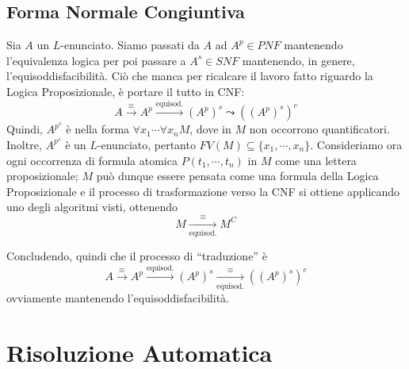 \subsection{Forma Normale Congiuntiva}
Sia $A$ un $L$-enunciato. Siamo passati da $A$ ad $A^p \in PNF$ mantenendo 
l'equivalenza logica per poi passare a $A^s \in SNF$ mantenendo, in genere, 
l'equisoddisfacibilità. Ciò che manca per ricalcare il lavoro fatto riguardo 
la Logica Proposizionale, è portare il tutto in CNF: 
$$
A \xrightarrow{\equiv} A^p \xrightarrow{\text{equisod.}}(A^p)^s \leadsto ((A^p)^s)^c
$$
Quindi, $A^{p^s}$ è nella forma $\forall x_1 \cdots \forall x_n M$, dove in $M$ 
non occorrono quantificatori. Inoltre, $A^{p^s}$ è un $L$-enunciato, pertanto 
$FV(M) \subseteq \{x_1, \cdots, x_n\}$.
Consideriamo ora ogni occorrenza di formula atomica $P(t_1, \cdots, t_n)$ in 
$M$ come una lettera proposizionale; $M$ può dunque essere pensata 
come una formula della Logica Proposizionale e il processo di trasformazione 
verso la CNF si ottiene applicando uno degli algoritmi visti, ottenendo 
$$
M \xrightarrow[\text{equisod.}]{\equiv} M^C
$$

Concludendo, quindi che il processo di ``traduzione'' è 
$$
A \xrightarrow{\equiv} A^p \xrightarrow{\text{equisod.}}(A^p)^s \xrightarrow[\text{equisod.}]{\equiv} ((A^p)^s)^c
$$
ovviamente mantenendo l'equisoddisfacibilità. 

\section{Risoluzione Automatica}
